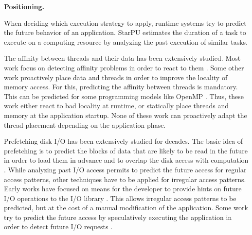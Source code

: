 \documentclass[a4paper,11pt,defblank]{article}
\begin{document}




\textbf{Positioning.}




When deciding which execution strategy to apply, runtime systems try
to predict the future behavior of an application. StarPU estimates
the duration of a task to execute on a computing resource by
analyzing the past execution of similar tasks\cite{starpu}.


The affinity between threads and their data has been extensively
studied. Most work focus on detecting affinity problems in order to
react to them \cite{carrefour, diener2014kmaf}. Some other work
proactively place data and threads in order to improve the locality of
memory access. For this, predicting the affinity between threads is
mandatory. This can be predicted for some programming models like
OpenMP \cite{forestgomp}. Thus, these work either react to bad
locality at runtime, or statically place threads and memory at the
application startup. None of these work can proactively adapt the
thread placement depending on the application phase.

Prefetching disk I/O has been extensively studied for decades. The
basic idea of prefetching is to predict the blocks of data that are
likely to be read in the future in order to load them in advance and
to overlap the disk access with computation
\cite{cao1996implementation, ding2007diskseen, prefetch_liao}.
%
While analyzing past I/O access permits to predict the future access
for regular access patterns, other techniques have to be applied for
irregular access patterns.
%
Early works have focused on means for the developer to provide hints
on future I/O operations to the I/O library \cite{Patterson}. This
allows irregular access patterns to be predicted, but at the cost of a
manual modification of the application.
%
Some work try to predict the future access
by speculatively executing the application in order to detect future
I/O requests \cite{chang1999automatic}.
\end{document}
